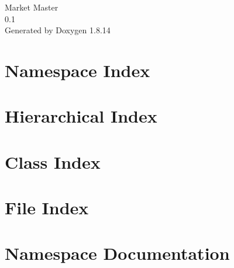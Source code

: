 \documentclass[twoside]{book}
\newcommand{\+}{\discretionary{\mbox{\scriptsize$\hookleftarrow$}}{}{}}
\newcommand{\clearemptydoublepage}{%
  \newpage{\pagestyle{empty}\cleardoublepage}%
}
\begin{document}
\hypersetup{pageanchor=false,
             bookmarksnumbered=true,
             pdfencoding=unicode
            }
\begin{titlepage}
\vspace*{7cm}
\begin{center}%
{\Large Market Master \\[1ex]\large 0.\+1 }\\
\vspace*{1cm}
{\large Generated by Doxygen 1.8.14}\\
\end{center}
\end{titlepage}
\clearemptydoublepage
{}
\tableofcontents
\clearemptydoublepage
{}
\hypersetup{pageanchor=true}

\chapter{Namespace Index}

\chapter{Hierarchical Index}

\chapter{Class Index}

\chapter{File Index}

\chapter{Namespace Documentation}





\end{document}

